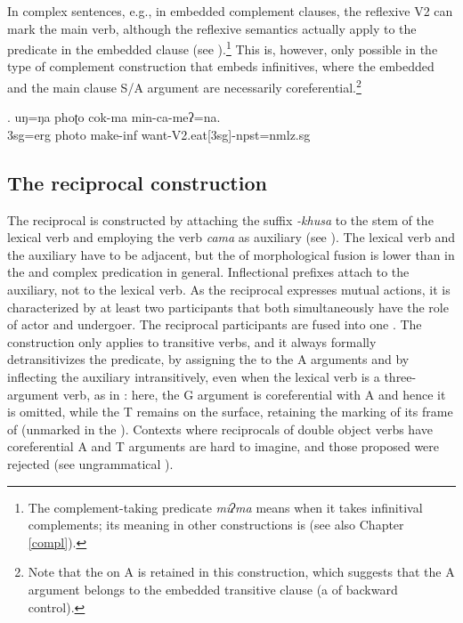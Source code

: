 In complex sentences, e.g., in embedded complement clauses, the reflexive V2 can mark the main verb, although the reflexive semantics actually apply to the predicate in the embedded clause (see \Next).\footnote{The complement-taking predicate \emph{miʔma} means  when it takes infinitival complements; its meaning in other constructions is  (see also Chapter \ref{compl}).} This is, however, only possible in the type of complement construction that embeds infinitives, where the embedded and the main clause  S/A argument are necessarily coreferential.\footnote{Note that the  on A is retained in this construction, which suggests that the A argument belongs to the embedded transitive clause (a  of backward control).} 


\exg. uŋ=ŋa phoʈo cok-ma min-ca-meʔ=na.\\
		{\sc 3sg=erg} photo make{\sc -inf} want-{\sc V2.eat[3sg]-npst=nmlz.sg}	\\
 	



\subsection{The reciprocal construction}\label{refl3}

The reciprocal is constructed by attaching the suffix \emph{-khusa} to the stem of the lexical verb and employing the verb \emph{cama}  as auxiliary (see \Next[a]). The lexical verb and the auxiliary have to be adjacent, but the  of morphological fusion is lower than in the  and complex predication in general. Inflectional prefixes attach to the auxiliary, not to the lexical verb. As the reciprocal expresses mutual actions, it is characterized by at least two participants that both simultaneously have the role of actor and undergoer. The reciprocal participants are fused into one . The construction only applies to transitive verbs, and it always formally detransitivizes the predicate, by assigning the   to the A arguments and by inflecting the auxiliary intransitively, even when the lexical verb is a three-argument verb, as in  \Next[b]: here, the G argument  is coreferential with A and hence it is omitted, while the T remains on the surface, retaining the  marking of its frame of  (unmarked  in the ). Contexts where reciprocals of double object verbs have coreferential A and T arguments are hard to imagine, and those proposed were rejected (see ungrammatical \Next[c]). 
 
